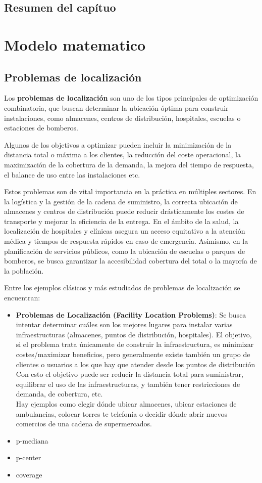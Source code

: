 \documentclass[12pt,a4paper]{book}
\begin{document}
\section{Resumen del capítuo}

\chapter{Modelo matematico}

\section{Problemas de localización}

Los \textbf{problemas de localización} son uno de los tipos principales de optimización combinatoria, que buscan determinar la ubicación óptima para construir instalaciones, como almacenes, centros de distribución, hospitales, escuelas o estaciones de bomberos. 

Algunos de los objetivos a optimizar pueden incluir la minimización de la distancia total o máxima a los clientes, la reducción del coste operacional, la maximización de la cobertura de la demanda, la mejora del tiempo de respuesta, el balance de uso entre las instalaciones etc.

Estos problemas son de vital importancia en la práctica en múltiples sectores. En la logística y la gestión de la cadena de suministro, la correcta ubicación de almacenes y centros de distribución puede reducir drásticamente los costes de transporte y mejorar la eficiencia de la entrega. En el ámbito de la salud, la localización de hospitales y clínicas asegura un acceso equitativo a la atención médica y tiempos de respuesta rápidos en caso de emergencia. Asimismo, en la planificación de servicios públicos, como la ubicación de escuelas o parques de bomberos, se busca garantizar la accesibilidad cobertura del total o la mayoría de la población.

Entre los ejemplos clásicos y más estudiados de problemas de localización se encuentran:

\begin{itemize}
    \item \textbf{Problemas de Localización (Facility Location Problems)}: Se busca intentar determinar cuáles son los mejores lugares para instalar varias infraestructuras (almacenes, puntos de distribución, hospitales). El objetivo, si el problema trata únicamente de construir la infraestructura, es minimizar costes/maximizar beneficios, pero generalmente existe también un grupo de clientes o usuarios a los que hay que atender desde los puntos de distribución Con esto el objetivo puede ser reducir la distancia total para suministrar, equilibrar
el uso de las infraestructuras, y también tener restricciones de demanda, de cobertura, etc.\\
Hay ejemplos como elegir dónde ubicar almacenes, ubicar estaciones de ambulancias, colocar torres te telefonía o decidir dónde abrir nuevos comercios de una cadena de supermercados.
    \item p-mediana
    \item p-center
    \item coverage
\end{itemize}
\end{document}

